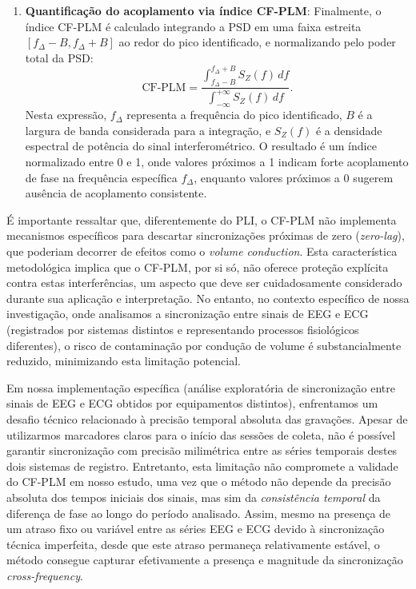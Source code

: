 \begin{enumerate}
    \item \textbf{Quantificação do acoplamento via índice CF-PLM}: Finalmente, o índice CF-PLM é calculado integrando a PSD em uma faixa estreita \([f_\Delta - B, f_\Delta + B]\) ao redor do pico identificado, e normalizando pelo poder total da PSD:
    \[
    \text{CF-PLM} = \frac{\displaystyle\int_{f_\Delta - B}^{f_\Delta + B} S_Z(f) \, df}{\displaystyle\int_{-\infty}^{+\infty} S_Z(f) \, df}.
    \]
    Nesta expressão, \(f_\Delta\) representa a frequência do pico identificado, \(B\) é a largura de banda considerada para a integração, e \(S_Z(f)\) é a densidade espectral de potência do sinal interferométrico. O resultado é um índice normalizado entre 0 e 1, onde valores próximos a 1 indicam forte acoplamento de fase na frequência específica \(f_\Delta\), enquanto valores próximos a 0 sugerem ausência de acoplamento consistente.
\end{enumerate}

É importante ressaltar que, diferentemente do PLI, o CF-PLM não implementa mecanismos específicos para descartar sincronizações próximas de zero (\textit{zero-lag}), que poderiam decorrer de efeitos como o \textit{volume conduction}. Esta característica metodológica implica que o CF-PLM, por si só, não oferece proteção explícita contra estas interferências, um aspecto que deve ser cuidadosamente considerado durante sua aplicação e interpretação. No entanto, no contexto específico de nossa investigação, onde analisamos a sincronização entre sinais de EEG e ECG (registrados por sistemas distintos e representando processos fisiológicos diferentes), o risco de contaminação por condução de volume é substancialmente reduzido, minimizando esta limitação potencial.

Em nossa implementação específica (análise exploratória de sincronização entre sinais de EEG e ECG obtidos por equipamentos distintos), enfrentamos um desafio técnico relacionado à precisão temporal absoluta das gravações. Apesar de utilizarmos marcadores claros para o início das sessões de coleta, não é possível garantir sincronização com precisão milimétrica entre as séries temporais destes dois sistemas de registro. Entretanto, esta limitação não compromete a validade do CF-PLM em nosso estudo, uma vez que o método não depende da precisão absoluta dos tempos iniciais dos sinais, mas sim da \textit{consistência temporal} da diferença de fase ao longo do período analisado. Assim, mesmo na presença de um atraso fixo ou variável entre as séries EEG e ECG devido à sincronização técnica imperfeita, desde que este atraso permaneça relativamente estável, o método consegue capturar efetivamente a presença e magnitude da sincronização \textit{cross-frequency}.

